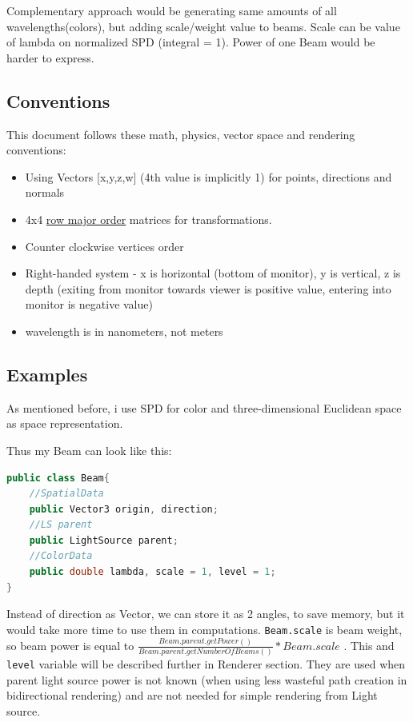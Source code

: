 \documentclass[12pt, letterpaper]{article}
\begin{document}
Complementary approach would be generating same amounts of all wavelengths(colors), but adding scale/weight value to beams. Scale can be value of lambda on normalized SPD (integral = 1). Power of one Beam would be harder to express.

\subsection{Conventions}
This document follows these math, physics, vector space and rendering conventions:
\begin{itemize}
\item Using Vectors [x,y,z,w] (4th value is implicitly 1) for points, directions and normals
\item 4x4 \href{https://en.wikipedia.org/wiki/Row-_and_column-major_order}{row major order} matrices for transformations. 
\item Counter clockwise vertices order
\item Right-handed system - x is horizontal (bottom of monitor), y is vertical, z is depth (exiting from monitor towards viewer is positive value, entering into monitor is negative value)
\item wavelength is in nanometers, not meters
\end{itemize}

\subsection{Examples}
As mentioned before, i use SPD for color and three-dimensional Euclidean space as space representation.

Thus my Beam can look like this:
\begin{lstlisting}[language=Java]
public class Beam{
	//SpatialData
	public Vector3 origin, direction;
	//LS parent
	public LightSource parent;
	//ColorData
	public double lambda, scale = 1, level = 1;
}
\end{lstlisting}
Instead of direction as Vector, we can store it as 2 angles, to save memory, but it would take more time to use them in computations.
\verb|Beam.scale| is beam weight, so beam power is equal to $\frac{Beam.parent.getPower()}{Beam.parent.getNumberOfBeams()} * Beam.scale$ . This and \verb|level| variable will be described further in Renderer section. They are used when parent light source power is not known (when using less wasteful path creation in bidirectional rendering) and are not needed for simple rendering from Light source.
\end{document}
